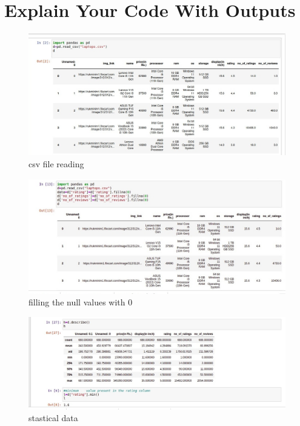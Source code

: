 \section{Explain Your Code With Outputs}
\begin{figure}[h]
\centering
\footnotesize
\includegraphics[width=7in]{20.jpeg}
\caption{csv file reading}
\label{fig:unevenlight}
\end{figure}

\vspace{4\baselineskip}
\begin{figure}[h]
\centering
\footnotesize
\includegraphics[width=6in]{21.jpeg}
\caption{filling the null values with 0}
\label{fig:unevenlight}
\end{figure}
\vspace{10\baselineskip}
\begin{figure}[h]
\centering
\footnotesize
\includegraphics[width=9in]{22.jpeg}
\caption{stastical data}
\label{fig:unevenlight}
\end{figure}
\vspace{7\baselineskip}

